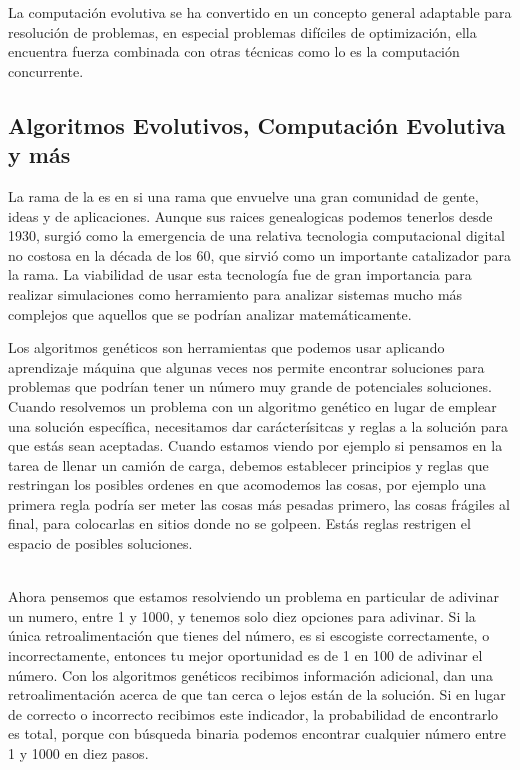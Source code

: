 \documentclass{article}
\begin{document}
La computación evolutiva se ha convertido en un concepto general adaptable para
resolución de problemas, en especial problemas difíciles de optimización, ella encuentra fuerza combinada con otras técnicas como lo es la computación concurrente. 

\subsection*{Algoritmos Evolutivos, Computaci\'on Evolutiva y m\'as}

La rama de la  es en si una rama que envuelve una gran comunidad de gente, ideas y de aplicaciones. Aunque sus raices genealogicas podemos tenerlos desde 1930, surgi\'o como la emergencia de una relativa tecnologia computacional digital no costosa en la d\'ecada de los 60, que sirvi\'o como un importante catalizador para la rama. La viabilidad de usar esta tecnolog\'ia fue de gran importancia para realizar simulaciones como herramiento para analizar sistemas mucho m\'as complejos que aquellos que se podr\'ian analizar matem\'aticamente.

Los algoritmos genéticos son herramientas que podemos usar aplicando aprendizaje máquina que algunas veces nos permite encontrar soluciones para problemas que podrían tener un número muy grande de potenciales soluciones. Cuando resolvemos un problema con un algoritmo genético en lugar de emplear una solución específica, necesitamos dar carácterísitcas y reglas a la solución para que estás sean aceptadas. Cuando estamos viendo por ejemplo si pensamos en la tarea de llenar un camión de carga, debemos establecer principios y reglas que restringan los posibles ordenes en que acomodemos las cosas, por ejemplo una primera regla podría ser meter las cosas más pesadas primero, las cosas frágiles al final, para colocarlas en sitios donde no se golpeen. Estás reglas restrigen el espacio de posibles soluciones.

\\
Ahora pensemos que estamos resolviendo un problema en particular de adivinar un numero, entre 1 y 1000, y tenemos solo diez opciones para adivinar. Si la única retroalimentación que tienes del número, es si escogiste correctamente, o incorrectamente, entonces tu mejor oportunidad es de 1 en 100 de adivinar el número. Con los algoritmos genéticos recibimos información adicional, dan una retroalimentación acerca de que tan cerca o lejos están de la solución.
Si en lugar de correcto o incorrecto recibimos este indicador, la probabilidad de encontrarlo es total, porque con búsqueda binaria podemos encontrar cualquier número entre 1 y 1000 en diez pasos.
\end{document}
